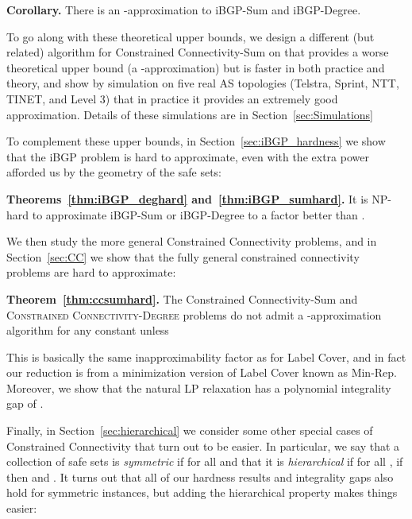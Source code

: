 \documentclass[11pt,letterpaper]{article}
\theoremstyle{definition}
\begin{document}
{\bf Corollary.}\hspace{.01in}
  There is an -approximation to {\sc iBGP-Sum} and
  {\sc iBGP-Degree}.
\vspace{.1in}

To go along with these theoretical upper bounds, we design a different (but related) algorithm for {\sc Constrained Connectivity-Sum} on  that provides a worse theoretical upper bound (a -approximation) but is faster in both practice and theory, and show by simulation on five real AS topologies (Telstra, Sprint, NTT, TINET, and Level 3) that in practice it provides an extremely good approximation.  Details of these simulations are in Section~\ref{sec:Simulations}

To complement these upper bounds, in Section~\ref{sec:iBGP_hardness} we show that the iBGP problem is hard to approximate, even with the extra power afforded us by the geometry of the safe sets:
\vspace{.1in}

{\bf Theorems~\ref{thm:iBGP_deghard} and~\ref{thm:iBGP_sumhard}.}\hspace{.01in}
  It is NP-hard to approximate {\sc iBGP-Sum} or {\sc iBGP-Degree} to
  a factor better than .
\vspace{.1in}

We then study the more general Constrained Connectivity problems, and in Section~\ref{sec:CC} we show that the fully general
constrained connectivity problems are hard to approximate:

\vspace{.1in}
{\bf Theorem~\ref{thm:ccsumhard}.}\hspace{.01in}
  {\sc The Constrained Connectivity-Sum} and \textsc{Constrained
    Connectivity-Degree} problems do not admit a -approximation algorithm for any constant  unless
  
\vspace{.1in}

This is basically the same inapproximability factor as for Label
Cover, and in fact our reduction is from a minimization version of
Label Cover known as {\sc Min-Rep}.  Moreover, we show that the
natural LP relaxation has a polynomial integrality gap of
.

Finally, in Section~\ref{sec:hierarchical}
 we consider some other special cases of Constrained
Connectivity that turn out to be easier.
In particular, we say that a collection of
safe sets is \emph{symmetric} if  for all  and that it is \emph{hierarchical} if for all , if  then  and .  It turns out that all of our hardness results and integrality gaps also hold for symmetric instances, but adding the hierarchical property makes things easier:
\vspace{.1in}
\end{document}
